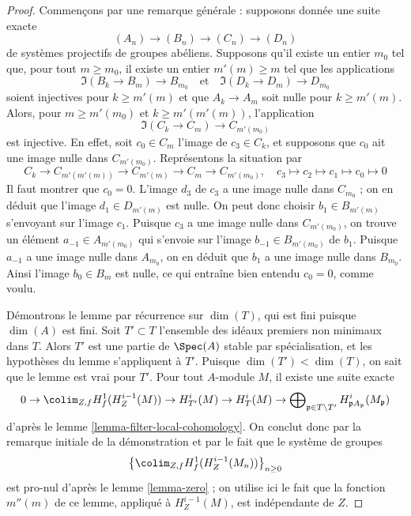\begin{proof}
Commençons par une remarque générale : supposons donnée une suite exacte
$$
(A_n) \to (B_n) \to (C_n) \to (D_n)
$$
de systèmes projectifs de groupes abéliens. Supposons qu'il existe un entier $m_0$ tel que, pour tout $m \geq m_0$, il existe un entier $m'(m) \geq m$ tel que les applications
$$
\Im(B_k \to B_m) \longrightarrow B_{m_0}
\quad\text{et}\quad
\Im(D_k \to D_m) \longrightarrow D_{m_0}
$$
soient injectives pour $k \geq m'(m)$ et que $A_k \to A_m$ soit nulle pour $k \geq m'(m)$. Alors, pour $m \geq m'(m_0)$ et $k \geq m'(m'(m))$, l'application
$$
\Im(C_k \to C_m) \to C_{m'(m_0)}
$$
est injective. En effet, soit $c_0 \in C_m$ l'image de $c_3 \in C_k$, et supposons que $c_0$ ait une image nulle dans $C_{m'(m_0)}$. Représentons la situation par
$$
C_k \to C_{m'(m'(m))} \to C_{m'(m)} \to C_m \to C_{m'(m_0)},\quad
c_3 \mapsto c_2 \mapsto c_1 \mapsto c_0 \mapsto 0
$$
Il faut montrer que $c_0 = 0$. L'image $d_3$ de $c_3$ a une image nulle dans $C_{m_0}$ ; on en déduit que l'image $d_1 \in D_{m'(m)}$ est nulle. On peut donc choisir $b_1 \in B_{m'(m)}$ s'envoyant sur l'image $c_1$. Puisque $c_3$ a une image nulle dans $C_{m'(m_0)}$, on trouve un élément $a_{-1} \in A_{m'(m_0)}$ qui s'envoie sur l'image $b_{-1} \in B_{m'(m_0)}$ de $b_1$. Puisque $a_{-1}$ a une image nulle dans $A_{m_0}$, on en déduit que $b_1$ a une image nulle dans $B_{m_0}$. Ainsi l'image $b_0 \in B_m$ est nulle, ce qui entraîne bien entendu $c_0 = 0$, comme voulu.

\medskip\noindent
Démontrons le lemme par récurrence sur $\dim(T)$, qui est fini puisque $\dim(A)$ est fini. Soit $T' \subset T$ l'ensemble des idéaux premiers non minimaux dans $T$. Alors $T'$ est une partie de $\Spec(A)$ stable par spécialisation, et les hypothèses du lemme s'appliquent à $T'$. Puisque $\dim(T') < \dim(T)$, on sait que le lemme est vrai pour $T'$. Pour tout $A$-module $M$, il existe une suite exacte
$$
0 \to \colim_{Z, f} H^1_f(H^{i - 1}_Z(M)) \to
H^i_{T'}(M) \to H^i_T(M) \to
\bigoplus\nolimits_{\mathfrak p \in T \setminus T'}
H^i_{\mathfrak p A_\mathfrak p}(M_\mathfrak p)
$$
d'après le lemme \ref{lemma-filter-local-cohomology}. On conclut donc par la remarque initiale de la démonstration et par le fait que le système de groupes
$$
\left\{\colim_{Z, f} H^1_f(H^{i - 1}_Z(M_n))\right\}_{n \geq 0}
$$
est pro-nul d'après le lemme \ref{lemma-zero} ; on utilise ici le fait que la fonction $m''(m)$ de ce lemme, appliqué à $H^{i - 1}_Z(M)$, est indépendante de $Z$.
\end{proof}










